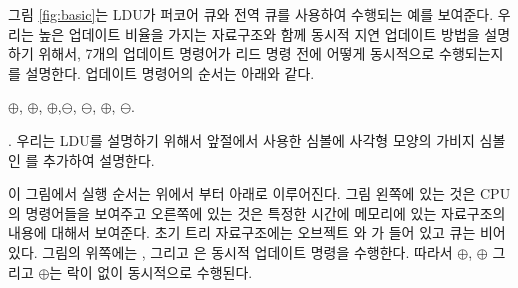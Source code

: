 
그림 \ref{fig:basic}는 LDU가 퍼코어 큐와 전역 큐를 사용하여 수행되는 예를 보여준다.
우리는 높은 업데이트 비율을 가지는 자료구조와 함께
 동시적 지연 업데이트 방법을 설명하기 위해서, 7개의 업데이트 명령어가 리드 명령 전에 
 어떻게 동시적으로 수행되는지를 설명한다.
업데이트 명령어의 순서는 아래와 같다. 
\begin{center}
$\oplus$, $\oplus$, $\oplus$,$\ominus$,
$\ominus$, $\oplus$, $\ominus$. 
\end{center}.
우리는 LDU를 설명하기 위해서 앞절에서 사용한 심볼에 사각형 모양의 가비지 심볼인 를 
추가하여 설명한다. 

이 그림에서 실행 순서는 위에서 부터 아래로 이루어진다.
그림 왼쪽에 있는 것은 CPU의 명령어들을 보여주고 오른쪽에 있는 것은 특정한 시간에 메모리에 있는
자료구조의 내용에 대해서 보여준다. 
초기 트리 자료구조에는 오브젝트 와 가 들어 있고 큐는 비어 있다.
그림의 위쪽에는 ,  그리고 은 동시적 업데이트 명령을 수행한다.
따라서 $\oplus$, $\oplus$ 그리고 $\oplus$는 락이 없이 동시적으로
수행된다.

